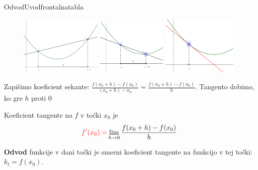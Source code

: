 \begin{priprava}{}{}{Odvod}{Uvod}{frontalna}{tabla}
\newpage

\begin{figure}[h]
    \centering
    \includegraphics[width=0.35\textwidth]{slike/odvod1.png}
    \includegraphics[width=0.3\textwidth]{slike/odvod2.png}
    \includegraphics[width=0.32\textwidth]{slike/odvod3.png}
\end{figure}


Zapišimo koeficient sekante: $ \frac{f(x_0 + h) - f(x_0)}{(x_0 + h) - x_0} = \frac{f(x_0 + h) - f(x_0)}{h} $. Tangento dobimo, ko gre $ h $ proti $ 0 $ 

Koeficient tangente na $ f $ v točki $ x_0 $ je 
$$ \textcolor{red}{f'(x_0) = } \lim_{h \to 0} \frac{f(x_0 + h) - f(x_0)}{h} $$


\textbf{Odvod} funkcije v dani točki je smerni koeficient tangente na funkcijo v tej točki: $ k_t = f(x_0) $.


\end{priprava}

